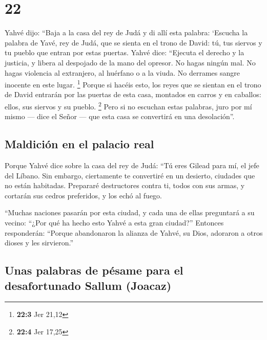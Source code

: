 \hypertarget{section-21}{%
\section{22}\label{section-21}}

 Yahvé dijo: ``Baja a la casa del rey de Judá y di allí
esta palabra:  `Escucha la palabra de Yavé, rey de Judá,
que se sienta en el trono de David: tú, tus siervos y tu pueblo que
entran por estas puertas.  Yahvé dice: ``Ejecuta el
derecho y la justicia, y libera al despojado de la mano del opresor. No
hagas ningún mal. No hagas violencia al extranjero, al huérfano o a la
viuda. No derrames sangre inocente en este lugar. \footnote{\textbf{22:3}
  Jer 21,12}  Porque si hacéis esto, los reyes que se
sientan en el trono de David entrarán por las puertas de esta casa,
montados en carros y en caballos: ellos, sus siervos y su pueblo.
\footnote{\textbf{22:4} Jer 17,25}  Pero si no escuchan
estas palabras, juro por mí mismo --- dice el Señor --- que esta casa se
convertirá en una desolación''.

\hypertarget{maldiciuxf3n-en-el-palacio-real}{%
\subsection{Maldición en el palacio
real}\label{maldiciuxf3n-en-el-palacio-real}}

 Porque Yahvé dice sobre la casa del rey de Judá: ``Tú
eres Gilead para mí, el jefe del Líbano. Sin embargo, ciertamente te
convertiré en un desierto, ciudades que no están habitadas.
 Prepararé destructores contra ti, todos con sus armas, y
cortarán sus cedros preferidos, y los echó al fuego.

 ``Muchas naciones pasarán por esta ciudad, y cada una de
ellas preguntará a su vecino: ``¿Por qué ha hecho esto Yahvé a esta gran
ciudad?''  Entonces responderán: ``Porque abandonaron la
alianza de Yahvé, su Dios, adoraron a otros dioses y les sirvieron.''

\hypertarget{unas-palabras-de-puxe9same-para-el-desafortunado-sallum-joacaz}{%
\subsection{Unas palabras de pésame para el desafortunado Sallum
(Joacaz)}\label{unas-palabras-de-puxe9same-para-el-desafortunado-sallum-joacaz}}

